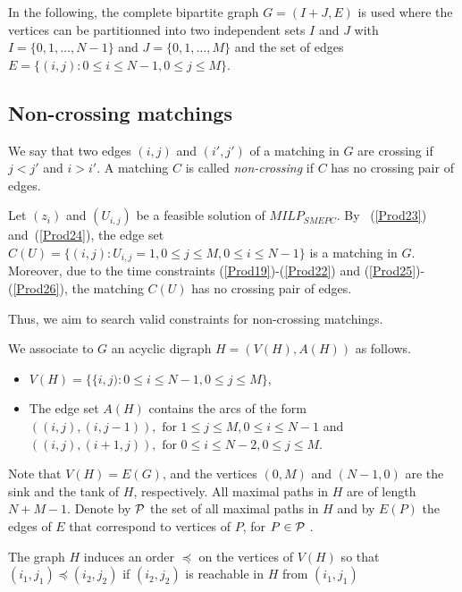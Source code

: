 \documentclass[11pt]{article}
\theoremstyle{plain}%
\theoremstyle{definition} \newtheorem{lem}{Lemma}[section]
\theoremstyle{definition} \newtheorem{claim}{Claim}[lem]
\theoremstyle{definition} \newtheorem{theorem}{Theorem}[section]
\theoremstyle{definition} \newtheorem{exo}{Exercice n$^\circ$}
\theoremstyle{definition} \newtheorem{quest}{}[exo]
\theoremstyle{definition} \newtheorem{sousquest}{}[quest]
\theoremstyle{remark}
\theoremstyle{definition}
\begin{document}
In the following, the complete bipartite graph $G=(I+J, E)$ is used where the vertices can be partitionned into two independent sets $I$ and $J$ with $I=\{0,1, \dots,N-1\}$ and $J=\{0,1, \dots,M\}$ and  the set of edges $E=\{ (i, j ): 0 \le i \le N-1, 0 \le j \le M \}$.
%
\subsection{ Non-crossing matchings}\label{Non_crossing_matchings}
We say that two edges $(i,j)$ and $(i',j')$ of a matching in $G$ are crossing if $j<j'$ and $i >i'$. A matching $C$ is called {\it non-crossing} if $C$ has no crossing pair of edges.

 Let $(z_i)$ and $(U_{i, j})$ be a feasible solution of $MILP_{SMEPC}$.
By ~(\ref{Prod23}) and~(\ref{Prod24}), the edge set $C(U)=\{ (i,j) : U_{i, j}=1, 0 \leq j \leq M, 0 \leq i \leq N-1 \}$ is a matching in $G$. Moreover,
 due to the time constraints (\ref{Prod19})-(\ref{Prod22}) and (\ref{Prod25})-(\ref{Prod26}), the matching $C(U)$ has no crossing pair of edges. 

Thus, we aim to search valid constraints for non-crossing matchings.


We associate to $G$ an acyclic digraph $H=(V(H), A(H))$ as follows.
\begin{itemize}
\item[] $V(H)= \{ \{i, j ): 0 \le i \le N-1, 0 \le j \le M \}$,
\item[] The edge set $A(H)$ contains the arcs of the form $((i, j), (i,j-1)), \textrm{ for } 1 \le j \le M, 0 \le i \le N-1$ and
$((i, j), (i+1,j)), \textrm{ for }  0 \le i \le N-2,  0 \le j \le M$.
%
\end{itemize}
Note that $V(H) = E(G)$, and the vertices $(0,M)$ and $(N-1, 0)$ are the sink and the tank of $H$, respectively.
All maximal paths in $H$ are of length $N+M-1$. Denote by ${\cal P}$ the set of all maximal paths in $H$
and by $E(P)$ the edges of $E$ that correspond to vertices of $P$, for $P \in {\cal P}$ .

The graph $H$ induces an order $\preceq$ on the vertices of $V(H)$ so that $(i_1,j_1)\preceq (i_2,j_2)$ if $(i_2,j_2)$ is reachable in $H$ from $(i_1,j_1)$
\end{document}
